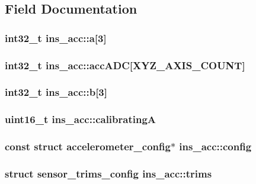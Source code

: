 \subsection{Field Documentation}
\hypertarget{structins__acc_aea2f201870898630cf84504bd7968484}{
\subsubsection[{a}]{\setlength{\rightskip}{0pt plus 5cm}int32\+\_\+t ins\+\_\+acc\+::a\mbox{[}3\mbox{]}}}\label{structins__acc_aea2f201870898630cf84504bd7968484}
\hypertarget{structins__acc_abe08deea0be0561c009fdeeae5e48792}{
\subsubsection[{acc\+A\+D\+C}]{\setlength{\rightskip}{0pt plus 5cm}int32\+\_\+t ins\+\_\+acc\+::acc\+A\+D\+C\mbox{[}{\bf X\+Y\+Z\+\_\+\+A\+X\+I\+S\+\_\+\+C\+O\+U\+N\+T}\mbox{]}}}\label{structins__acc_abe08deea0be0561c009fdeeae5e48792}
\hypertarget{structins__acc_ad193512d9a1454c203e1775145faa3c5}{
\subsubsection[{b}]{\setlength{\rightskip}{0pt plus 5cm}int32\+\_\+t ins\+\_\+acc\+::b\mbox{[}3\mbox{]}}}\label{structins__acc_ad193512d9a1454c203e1775145faa3c5}
\hypertarget{structins__acc_a08e8e02c8730fe3bcbaddf0b02c89b05}{
\subsubsection[{calibrating\+A}]{\setlength{\rightskip}{0pt plus 5cm}uint16\+\_\+t ins\+\_\+acc\+::calibrating\+A}}\label{structins__acc_a08e8e02c8730fe3bcbaddf0b02c89b05}
\hypertarget{structins__acc_a36f859ac11d25f59bbbb944df442909b}{
\subsubsection[{config}]{\setlength{\rightskip}{0pt plus 5cm}const struct {\bf accelerometer\+\_\+config}$\ast$ ins\+\_\+acc\+::config}}\label{structins__acc_a36f859ac11d25f59bbbb944df442909b}
\hypertarget{structins__acc_af55c9038d64349f4800cc859a171f234}{
\subsubsection[{trims}]{\setlength{\rightskip}{0pt plus 5cm}struct {\bf sensor\+\_\+trims\+\_\+config} ins\+\_\+acc\+::trims}}\label{structins__acc_af55c9038d64349f4800cc859a171f234}


